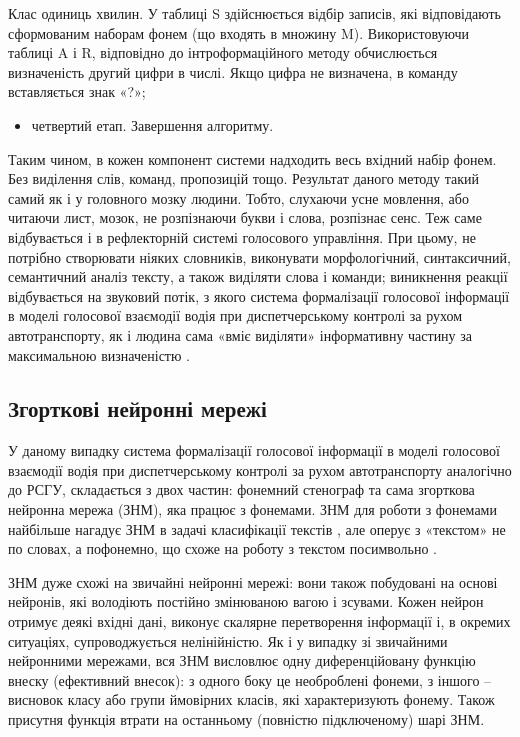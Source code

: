 Клас одиниць хвилин. У таблиці S здійснюється відбір записів, які відповідають сформованим наборам фонем (що входять в множину M). Використовуючи таблиці A і R, відповідно до інтроформаційного методу обчислюється визначеність другий цифри в числі. Якщо цифра не визначена, в команду вставляється знак «?»;

\begin{itemize}
	\item четвертий етап. Завершення алгоритму.
\end{itemize}

Таким чином, в кожен компонент системи надходить весь вхідний набір фонем. Без виділення слів, команд, пропозицій тощо. Результат даного методу такий самий як і у головного мозку людини. Тобто, слухаючи усне мовлення, або читаючи лист, мозок, не розпізнаючи букви і слова, розпізнає сенс. Теж саме відбувається і в рефлекторній системі голосового управління. При цьому, не потрібно створювати ніяких словників, виконувати морфологічний, синтаксичний, семантичний аналіз тексту, а також виділяти слова і команди; виникнення реакції відбувається на звуковий потік, з якого система формалізації голосової інформації в моделі голосової взаємодії водія при диспетчерському контролі за рухом автотранспорту, як і людина сама «вміє виділяти» інформативну частину за максимальною визначеністю \cite{Teslia_2013}.

\subsection{Згорткові нейронні мережі}

У даному випадку система формалізації голосової інформації в моделі голосової взаємодії водія при диспетчерському контролі за рухом автотранспорту аналогічно до РСГУ, складається з двох частин: фонемний стенограф та сама згорткова нейронна мережа (ЗНМ), яка працює з фонемами.
ЗНМ для роботи з фонемами найбільше нагадує ЗНМ в задачі класифікації текстів \cite{Kim_2014}, але оперує з «текстом» не по словах, а пофонемно, що схоже на роботу з текстом посимвольно \cite{Zhang_2016}.

ЗНМ дуже схожі на звичайні нейронні мережі: вони також побудовані на основі нейронів, які володіють постійно змінюваною вагою і зсувами. Кожен нейрон отримує деякі вхідні дані, виконує скалярне перетворення інформації і, в окремих ситуаціях, супроводжується нелінійністю. Як і у випадку зі звичайними нейронними мережами, вся ЗНМ висловлює одну диференційовану функцію внеску (ефективний внесок): з одного боку це необроблені фонеми, з іншого – висновок класу або групи ймовірних класів, які характеризують фонему. Також присутня функція втрати на останньому (повністю підключеному) шарі ЗНМ.

